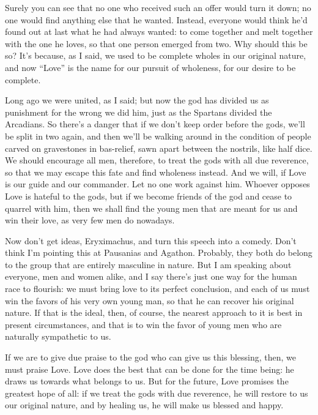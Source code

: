 Surely you can see that no one who received such an offer would turn it
down; no one would find anything else that he wanted. Instead, everyone
would think he'd found out at last what he had always wanted: to come
together and melt together with the one he loves, so that one person
emerged from two. Why should this be so? It's because, as I said, we
used to be complete wholes in our original nature, and now “Love” is the
name  for our pursuit of wholeness, for our desire to be
complete.

Long ago we were united, as I said; but now the god has divided us as
punishment for the wrong we did him, just as the Spartans divided the
Arcadians. So there's
a danger that if we don't keep order before the gods, we'll be split in
two again, and then we'll be walking around in the condition of people
carved on gravestones in bas-relief, sawn apart between the nostrils,
like half dice. We should encourage all men, therefore, to treat 
the gods with all due reverence, so that we may escape this fate and
find wholeness instead. And we will, if Love is our guide and our
commander. Let no one work against him. Whoever opposes Love is hateful
to the gods, but if we become friends of the god and cease to quarrel
with him, then we shall find the young men that are meant for us and win
their love, as very few men do nowadays.

 Now don't get ideas, Eryximachus, and turn this speech into a
comedy. Don't think I'm pointing this at Pausanias and Agathon.
Probably, they both do belong to the group that are entirely masculine
in nature. But I am speaking about everyone, men and women alike, and I
say there's just one way for the human race to flourish: we must bring
love to its perfect conclusion, and each of us must win the favors of
his very own young man, so that he can recover his original nature. If
that is the ideal, then, of course, the nearest approach to it is best
in present circumstances, and that is to win the favor of young men who
are naturally sympathetic to us.

 If we are to give due praise to the god who can give us this
blessing, then, we must praise Love. Love does the best that can be done
for the time being: he draws us towards what belongs to us. But for the
future, Love promises the greatest hope of all: if we treat the gods
with due reverence, he will restore to us our original nature, and by
healing us, he will make us blessed and happy.

